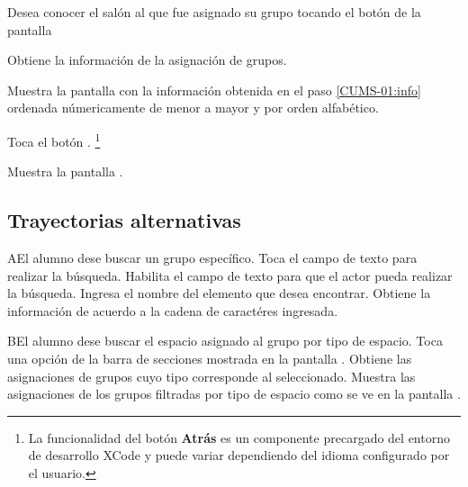  \begin{UCtrayectoria}
    \UCpaso[\UCactor] Desea conocer el salón al que fue asignado su grupo tocando el botón \botSalones de la pantalla 
    
     \UCpaso[\UCsist] Obtiene la información de la asignación de grupos. \label{CUMS-01:info}
    
    \UCpaso[\UCsist] \label{CUMS-01:salon}Muestra la pantalla  con la información obtenida en el paso \ref{CUMS-01:info} ordenada númericamente de menor a mayor y por orden alfabético.   
    
    \UCpaso[\UCactor] Toca el botón . \footnote{La funcionalidad del botón \textbf{Atrás} es un componente precargado del entorno de desarrollo XCode y puede variar dependiendo del idioma configurado por el usuario.}
    
    \UCpaso[\UCsist] Muestra la pantalla .
    
%    
%    

\end{UCtrayectoria}

\subsection{Trayectorias alternativas}

%
\begin{UCtrayectoriaA}{A}{El alumno dese buscar un grupo específico.}
	\UCpaso[\UCactor] Toca el campo de texto para realizar la búsqueda.
	\UCpaso[\UCsist] Habilita el campo de texto para que el actor pueda realizar la búsqueda.
	\UCpaso[\UCactor] Ingresa el nombre del elemento que desea encontrar.
	\UCpaso[\UCsist] Obtiene la información de acuerdo a la cadena de caractéres ingresada. 
\end{UCtrayectoriaA}

\begin{UCtrayectoriaA}{B}{El alumno dese buscar el espacio asignado al grupo por tipo de espacio.}
	\UCpaso[\UCactor] Toca una opción de la barra de secciones mostrada en la pantalla .
	\UCpaso[\UCsist] Obtiene las asignaciones de grupos cuyo tipo corresponde al seleccionado.
	\UCpaso[\UCsist] Muestra las asignaciones de los grupos filtradas por tipo de espacio como se ve en la pantalla . 
\end{UCtrayectoriaA}
 

